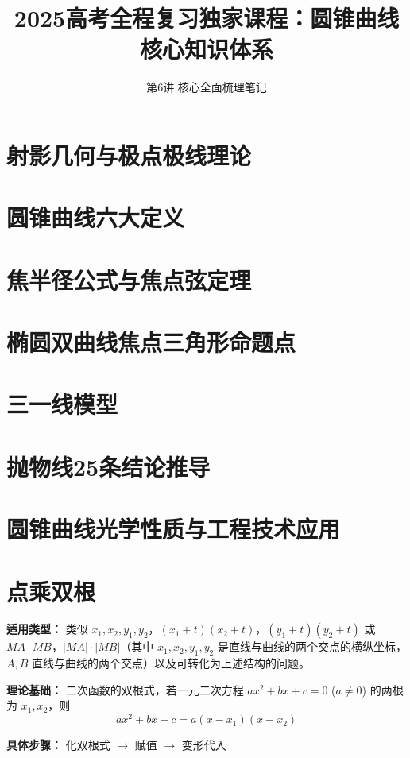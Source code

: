 \documentclass[UTF8,a4paper,12pt]{article}
\title{2025高考全程复习独家课程：圆锥曲线核心知识体系}
\author{第6讲 核心全面梳理笔记}
\date{}
\begin{document}
	
\section{射影几何与极点极线理论}

\section{圆锥曲线六大定义}

\subsection{}

\section{焦半径公式与焦点弦定理}

\section{椭圆双曲线焦点三角形命题点}

\section{三一线模型}

\section{抛物线25条结论推导}

\section{圆锥曲线光学性质与工程技术应用}

\section{点乘双根}

\textbf{适用类型：} 类似 \( x_1, x_2, y_1, y_2 \)，\( (x_1 + t)(x_2 + t) \)，\( (y_1 + t)(y_2 + t) \) 或 \( MA \cdot MB \)，\( |MA| \cdot |MB| \)（其中 \( x_1, x_2, y_1, y_2 \) 是直线与曲线的两个交点的横纵坐标，\( A, B \) 直线与曲线的两个交点）以及可转化为上述结构的问题。

\textbf{理论基础：} 二次函数的双根式，若一元二次方程 \( ax^2 + bx + c = 0 \) (\( a \neq 0 \)) 的两根为 \( x_1, x_2 \)，则
\[
ax^2 + bx + c = a(x - x_1)(x - x_2)
\]

\textbf{具体步骤：} 化双根式 $\rightarrow$ 赋值 $\rightarrow$ 变形代入
\end{document}
